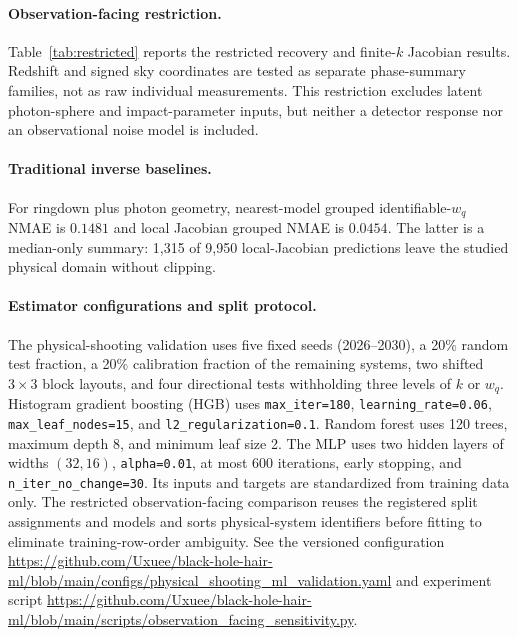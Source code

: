 \documentclass{article}
\begin{document}
\paragraph{Observation-facing restriction.} Table~\ref{tab:restricted} reports the restricted recovery and finite-$k$ Jacobian results. Redshift and signed sky coordinates are tested as separate phase-summary families, not as raw individual measurements. This restriction excludes latent photon-sphere and impact-parameter inputs, but neither a detector response nor an observational noise model is included.
\paragraph{Traditional inverse baselines.} For ringdown plus photon geometry, nearest-model grouped identifiable-$w_q$ NMAE is $0.1481$ and local Jacobian grouped NMAE is $0.0454$. The latter is a median-only summary: 1,315 of 9,950 local-Jacobian predictions leave the studied physical domain without clipping.
\paragraph{Estimator configurations and split protocol.}
The physical-shooting validation uses five fixed seeds (2026--2030), a 20\% random test fraction, a 20\% calibration fraction of the remaining systems, two shifted $3\times3$ block layouts, and four directional tests withholding three levels of $k$ or $w_q$. Histogram gradient boosting (HGB) uses \texttt{max\_iter=180}, \texttt{learning\_rate=0.06}, \texttt{max\_leaf\_nodes=15}, and \texttt{l2\_regularization=0.1}. Random forest uses 120 trees, maximum depth 8, and minimum leaf size 2. The MLP uses two hidden layers of widths $(32,16)$, \texttt{alpha=0.01}, at most 600 iterations, early stopping, and \texttt{n\_iter\_no\_change=30}. Its inputs and targets are standardized from training data only. The restricted observation-facing comparison reuses the registered split assignments and models and sorts physical-system identifiers before fitting to eliminate training-row-order ambiguity. See the versioned configuration \url{https://github.com/Uxuee/black-hole-hair-ml/blob/main/configs/physical_shooting_ml_validation.yaml} and experiment script \url{https://github.com/Uxuee/black-hole-hair-ml/blob/main/scripts/observation_facing_sensitivity.py}.
\end{document}
